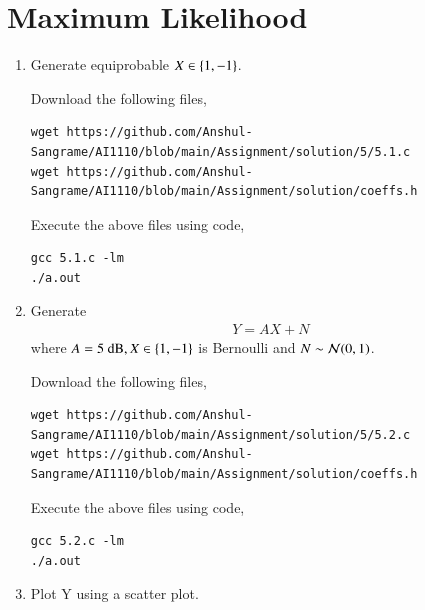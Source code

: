 \documentclass[journal,12pt,twocolumn]{IEEEtran}
\renewcommand\thesection{\arabic{section}}
\begin{document}
\section{Maximum Likelihood}
%
\begin{enumerate}[label=\thesection.\arabic*
,ref=\thesection.\theenumi]
%
\item Generate equiprobable $X \in \left\{1, -1\right\}$.

\solution

Download the following files,
\begin{lstlisting}
wget https://github.com/Anshul-Sangrame/AI1110/blob/main/Assignment/solution/5/5.1.c
wget https://github.com/Anshul-Sangrame/AI1110/blob/main/Assignment/solution/coeffs.h
\end{lstlisting}
Execute the above files using code,
\begin{lstlisting}
gcc 5.1.c -lm
./a.out
\end{lstlisting}
%
\item Generate 
	\begin{align}
		Y = AX + N
	\end{align}
where $A  = 5 \text{ dB}, X \in \left\{1, -1\right\}$ is Bernoulli and $N \sim \mathcal{N}(0, 1)$.

\solution

Download the following files,
\begin{lstlisting}
wget https://github.com/Anshul-Sangrame/AI1110/blob/main/Assignment/solution/5/5.2.c
wget https://github.com/Anshul-Sangrame/AI1110/blob/main/Assignment/solution/coeffs.h
\end{lstlisting}
Execute the above files using code,
\begin{lstlisting}
gcc 5.2.c -lm
./a.out
\end{lstlisting}
%
\item Plot Y using a scatter plot.

\solution


\end{enumerate}
\end{document}
